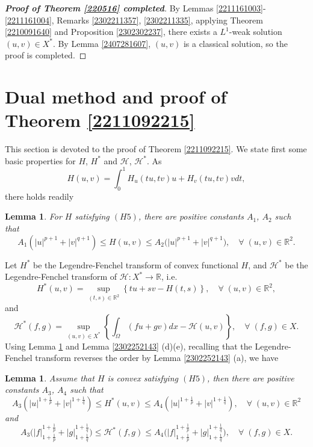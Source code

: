 \documentclass[10pt]{article}
\numberwithin{equation}{section}
\newtheorem{lemma}[theorem]{Lemma}
\newtheorem{remark}[theorem]{Remark}
\newcommand{\R}{\mathbb R}
\numberwithin{equation}{section}
\begin{document}
\begin{proof}[\bf Proof of Theorem \ref{220516} completed] By Lemmas \ref{2211161003}-\ref{2211161004}, Remarks \ref{2302211357}, \ref{2302211335}, applying Theorem \ref{2210091640} and Proposition \ref{2302302237}, there exists a $L^1$-weak solution $(u, v)\in X^*$. By Lemma \ref{2407281607}, $(u, v)$ is a classical solution, so the proof is completed.
\end{proof}


\section{Dual method and proof of Theorem \ref{2211092215}}\label{2306141749}
This section is devoted to the proof of Theorem \ref{2211092215}. We state first some basic properties for $H$, $H^*$ and $\mathcal{H}$, $\mathcal{H}^*$. As
\begin{equation}\label{2211052021}
H(u, v)= \int_0^1 H_u(tu, tv)u  + H_v(tu, tv)v dt, 
\end{equation}
there holds readily
\begin{lemma}\label{2211060953}
For $H$ satisfying $(H5)$, there are positive constants $A_1$, $A_2$ such that
\[
A_1 \left(|u|^{p+1}+ |v|^{q+1}\right)\le {H}(u, v)\le A_2\big(|u|^{p+1}+ |v|^{q+1}\big), \quad \forall\; (u, v) \in \R^2.
\]
\end{lemma}

Let $H^*$ be the Legendre-Fenchel transform of convex functional $H$, and $\mathcal{H}^*$ be the Legendre-Fenchel transform of $\mathcal{H}: X^*\to \mathbb{R}$, i.e.
\[
H^*(u, v)=\underset{(t, s)\in \mathbb{R}^2}{\sup}\left\{ tu+sv-H(t, s)\right\},\quad \forall\; (u,v)\in \mathbb{R}^2,
\]
and
\begin{equation}\label{2211072139}
\mathcal{H}^*(f, g)=\underset{(u, v)\in X^*}{\sup} \left\{ \int_{\Omega} (fu+gv) dx-\mathcal{H}(u, v)\right\},\quad \forall\; (f, g)\in X.
\end{equation}
Using Lemma \ref{2211060953} and Lemma \ref{2302252143} (d)(e), recalling that the Legendre-Fenchel transform reverses the order by Lemma \ref{2302252143} (a), we have
\begin{lemma}\label{2211011024}
Assume that $H$ is convex satisfying $(H5)$, then there are positive constants $A_3$, $A_4$ such that
\[
A_3\left(|u|^{1+\frac1p}+|v|^{1+\frac1q}\right)\le {H}^*(u, v)\le A_4\left(|u|^{1+\frac1p}+|v|^{1+\frac1q}\right), \quad \forall\; (u,v)\in \R^2
\]
and 
\[
A_3 \Big(|f|_{1+\frac1p}^{1+\frac1p}+ |g|_{1+\frac1q}^{1+\frac1q}\Big)\le \mathcal{H}^*(f, g)\le A_4 \Big(|f|_{1+\frac1p}^{1+\frac1p}+ |g|_{1+\frac1q}^{1+\frac1q}\Big), \quad \forall\; (f, g) \in X.
\]
\end{lemma}
\end{document}
